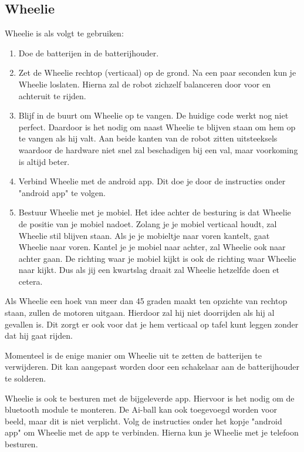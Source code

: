 \documentclass[12pt,a4paper]{article}
\begin{document}
\subsection{Wheelie}
Wheelie is als volgt te gebruiken:
	
\begin{enumerate}
	\item Doe de batterijen in de batterijhouder.
	\item Zet de Wheelie rechtop (verticaal) op de grond. 
	Na een paar seconden kun je Wheelie loslaten. Hierna zal de robot zichzelf balanceren door voor en achteruit te rijden. 
	\item Blijf in de buurt om Wheelie op te vangen.
	De huidige code werkt nog niet perfect. Daardoor is het nodig om naast Wheelie te blijven staan om hem op te vangen als hij valt. Aan beide kanten van de robot zitten uitsteeksels waardoor de hardware niet snel zal beschadigen bij een val, maar voorkoming is altijd beter. 
	\item Verbind Wheelie met de android app. 
	Dit doe je door de instructies onder "android app" te volgen.
	\item Bestuur Wheelie met je mobiel.
	Het idee achter de besturing is dat Wheelie de positie van je mobiel nadoet. Zolang je je mobiel verticaal houdt, zal Wheelie stil blijven staan. Als je je mobieltje naar voren kantelt, gaat Wheelie naar voren. Kantel je je mobiel naar achter, zal Wheelie ook naar achter gaan. De richting waar je mobiel kijkt is ook de richting waar Wheelie naar kijkt. Dus als jij een kwartslag draait zal Wheelie hetzelfde doen et cetera.
	
\end{enumerate}

	Als Wheelie een hoek van meer dan 45 graden maakt ten opzichte van rechtop staan, zullen de motoren uitgaan. Hierdoor zal hij niet doorrijden als hij al gevallen is. Dit zorgt er ook voor dat je hem verticaal op tafel kunt leggen zonder dat hij gaat rijden. 
	
Momenteel is de enige manier om Wheelie uit te zetten de batterijen te verwijderen. Dit kan aangepast worden door een schakelaar aan de batterijhouder te solderen.

Wheelie is ook te besturen met de bijgeleverde app. Hiervoor is het nodig om de bluetooth module te monteren. De Ai-ball kan ook toegevoegd worden voor beeld, maar dit is niet verplicht. Volg de instructies onder het kopje "android app" om Wheelie met de app te verbinden. Hierna kun je Wheelie met je telefoon besturen. 
\end{document}
